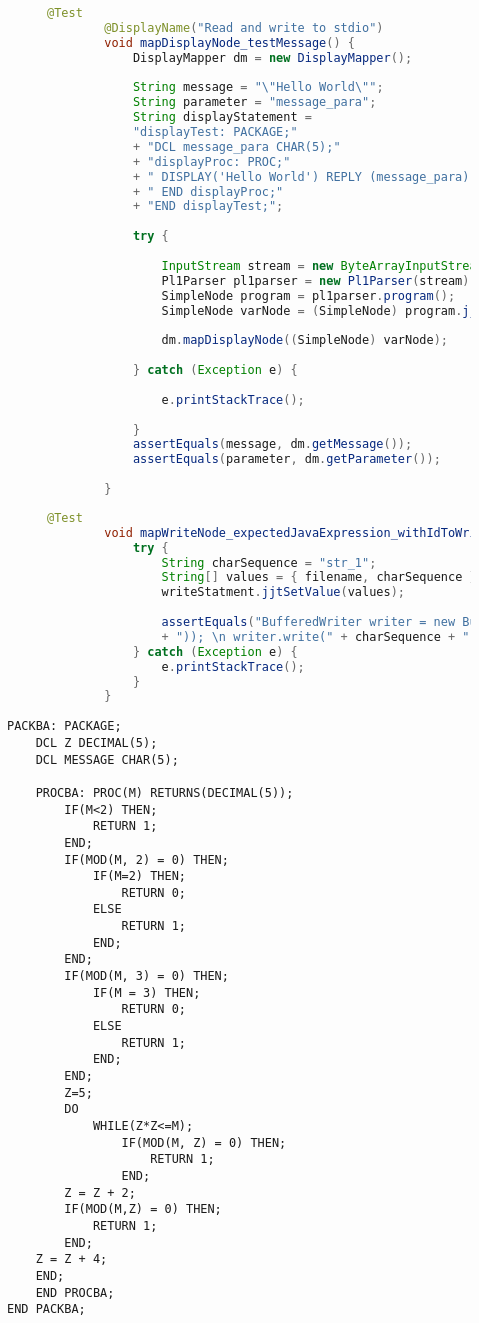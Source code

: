 \begin{figure}[H]
	\begin{lstlisting}[language=Java, caption=mapDisplayNode Test, label={lst:displayreply_test}]
		@Test
		@DisplayName("Read and write to stdio")
		void mapDisplayNode_testMessage() {
			DisplayMapper dm = new DisplayMapper();
			
			String message = "\"Hello World\"";
			String parameter = "message_para";
			String displayStatement = 
			"displayTest: PACKAGE;"
			+ "DCL message_para CHAR(5);"
			+ "displayProc: PROC;"
			+ " DISPLAY('Hello World') REPLY (message_para);"
			+ " END displayProc;"
			+ "END displayTest;";
			
			try {
				
				InputStream stream = new ByteArrayInputStream(displayStatement.getBytes(StandardCharsets.UTF_8));
				Pl1Parser pl1parser = new Pl1Parser(stream);
				SimpleNode program = pl1parser.program();
				SimpleNode varNode = (SimpleNode) program.jjtGetChild(0).jjtGetChild(2).jjtGetChild(1).jjtGetChild(0);
				
				dm.mapDisplayNode((SimpleNode) varNode);
				
			} catch (Exception e) {
				
				e.printStackTrace();
				
			}
			assertEquals(message, dm.getMessage());
			assertEquals(parameter, dm.getParameter());
			
		}
	\end{lstlisting}
\end{figure}

\begin{figure}[H]
	\begin{lstlisting}[language=Java, caption=mapWriteNode Test, label={lst:javawriter_test}]
		@Test
		void mapWriteNode_expectedJavaExpression_withIdToWriteTo() {
			try {
				String charSequence = "str_1";
				String[] values = { filename, charSequence };
				writeStatment.jjtSetValue(values);
				
				assertEquals("BufferedWriter writer = new BufferedWriter(new FileWriter(" + filename
				+ ")); \n writer.write(" + charSequence + ");", writeMapper.translate(writeStatment));
			} catch (Exception e) {
				e.printStackTrace();
			}
		}
	\end{lstlisting}
\end{figure}

\begin{lstlisting}[language=PL/I, caption=Probdivision-Algorhitmus PL/I, label={lst:pliprobedivision}]
PACKBA: PACKAGE;
	DCL Z DECIMAL(5);
	DCL MESSAGE CHAR(5);
	
	PROCBA: PROC(M) RETURNS(DECIMAL(5));
		IF(M<2) THEN;
			RETURN 1;
		END;
		IF(MOD(M, 2) = 0) THEN;
			IF(M=2) THEN;
				RETURN 0;
			ELSE
				RETURN 1;
			END;
		END;
		IF(MOD(M, 3) = 0) THEN;
			IF(M = 3) THEN;
				RETURN 0;
			ELSE
				RETURN 1;
			END;
		END;
		Z=5;
		DO
			WHILE(Z*Z<=M);
				IF(MOD(M, Z) = 0) THEN;
					RETURN 1;
				END;
		Z = Z + 2;
		IF(MOD(M,Z) = 0) THEN;
			RETURN 1;
		END;
	Z = Z + 4;
	END;
	END PROCBA;
END PACKBA;
\end{lstlisting}

